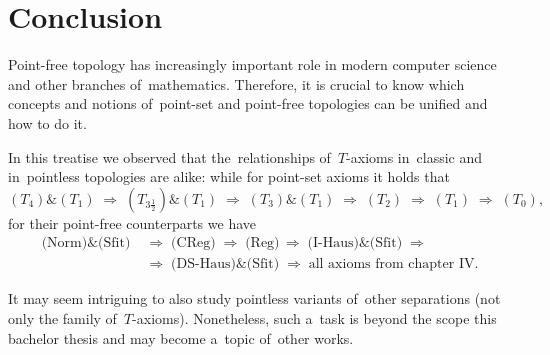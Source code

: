 \chapter*{Conclusion}

Point-free topology has increasingly important role in modern computer science
and other branches of~mathematics.
Therefore, it is crucial to know which concepts and notions of~point-set and
point-free topologies can be unified and how to do it.

In this treatise we observed that the~relationships of~$T$-axioms in~classic
and in~pointless topologies are alike:
while for point-set axioms it holds that
\[
  (T_4) \& (T_1)
  \; \Longrightarrow \; (T_{3\frac{1}{2}}) \& (T_1)
  \; \Longrightarrow \; (T_3) \& (T_1)
  \; \Longrightarrow \; (T_2)
  \; \Longrightarrow \; (T_1)
  \; \Longrightarrow \; (T_0),
\]
for their point-free counterparts we have
\begin{align*}
  \text{(Norm)} \& \text{(Sfit)}
  \; &\Rightarrow \; \text{(CReg)}
  \; \Rightarrow \; \text{(Reg)}
  \, \Rightarrow \; \text{(I-Haus)} \& \text{(Sfit)}
  \; \Rightarrow \\
  \; &\Rightarrow \; \text{(DS-Haus)} \& \text{(Sfit)}
  \; \Rightarrow \; \text{all axioms from chapter IV}.
\end{align*}

It may seem intriguing to also study pointless variants of~other separations
(not only the family of~$T$-axioms).
Nonetheless, such a~task is beyond the scope this bachelor thesis and may
become a~topic of~other works.
